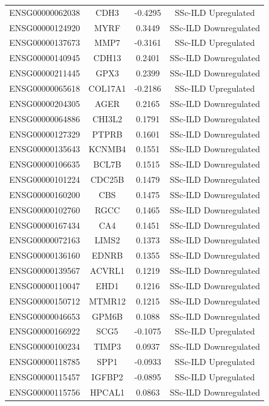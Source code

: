 \documentclass[
]{article}
\begin{document}
\begin{singlespace}
\begin{longtable}[t]{lccc}
\endfoot
\bottomrule
\endlastfoot
ENSG00000062038 & CDH3 & -0.4295 & SSc-ILD Upregulated\\
ENSG00000124920 & MYRF & 0.3449 & SSc-ILD Downregulated\\
ENSG00000137673 & MMP7 & -0.3161 & SSc-ILD Upregulated\\
ENSG00000140945 & CDH13 & 0.2401 & SSc-ILD Downregulated\\
ENSG00000211445 & GPX3 & 0.2399 & SSc-ILD Downregulated\\
\addlinespace
ENSG00000065618 & COL17A1 & -0.2186 & SSc-ILD Upregulated\\
ENSG00000204305 & AGER & 0.2165 & SSc-ILD Downregulated\\
ENSG00000064886 & CHI3L2 & 0.1791 & SSc-ILD Downregulated\\
ENSG00000127329 & PTPRB & 0.1601 & SSc-ILD Downregulated\\
ENSG00000135643 & KCNMB4 & 0.1551 & SSc-ILD Downregulated\\
\addlinespace
ENSG00000106635 & BCL7B & 0.1515 & SSc-ILD Downregulated\\
ENSG00000101224 & CDC25B & 0.1479 & SSc-ILD Downregulated\\
ENSG00000160200 & CBS & 0.1475 & SSc-ILD Downregulated\\
ENSG00000102760 & RGCC & 0.1465 & SSc-ILD Downregulated\\
ENSG00000167434 & CA4 & 0.1451 & SSc-ILD Downregulated\\
\addlinespace
ENSG00000072163 & LIMS2 & 0.1373 & SSc-ILD Downregulated\\
ENSG00000136160 & EDNRB & 0.1355 & SSc-ILD Downregulated\\
ENSG00000139567 & ACVRL1 & 0.1219 & SSc-ILD Downregulated\\
ENSG00000110047 & EHD1 & 0.1216 & SSc-ILD Downregulated\\
ENSG00000150712 & MTMR12 & 0.1215 & SSc-ILD Downregulated\\
\addlinespace
ENSG00000046653 & GPM6B & 0.1088 & SSc-ILD Downregulated\\
ENSG00000166922 & SCG5 & -0.1075 & SSc-ILD Upregulated\\
ENSG00000100234 & TIMP3 & 0.0937 & SSc-ILD Downregulated\\
ENSG00000118785 & SPP1 & -0.0933 & SSc-ILD Upregulated\\
ENSG00000115457 & IGFBP2 & -0.0895 & SSc-ILD Upregulated\\
\addlinespace
ENSG00000115756 & HPCAL1 & 0.0863 & SSc-ILD Downregulated\\

\end{longtable}
\end{singlespace}
\end{document}
